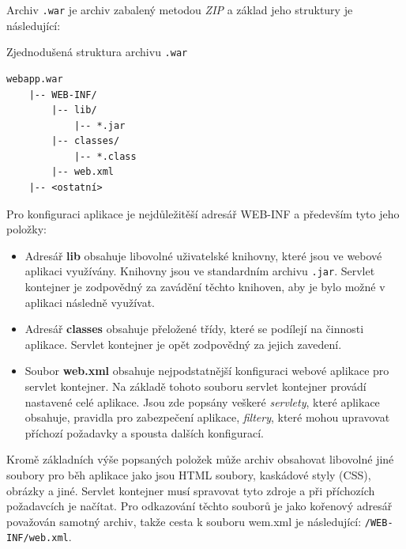             \medskip
            Archiv \texttt{.war} je archiv zabalený metodou \emph{ZIP} a základ jeho struktury je následující:
            
\begin{priklad} Zjednodušená struktura archivu \texttt{.war}
\begin{verbatim}
webapp.war
    |-- WEB-INF/
        |-- lib/
            |-- *.jar
        |-- classes/
            |-- *.class
        |-- web.xml
    |-- <ostatní>
\end{verbatim}
\end{priklad}


            Pro konfiguraci aplikace je nejdůležitěší adresář WEB-INF a především tyto jeho položky:

            \begin{itemize}
                \item Adresář \textbf{lib} obsahuje libovolné uživatelské knihovny, které jsou ve webové aplikaci využívány. 
                    Knihovny jsou ve standardním archivu \texttt{.jar}.
                    Servlet kontejner je zodpovědný za zavádění těchto knihoven, aby je bylo možné v aplikaci následně využívat.

                \item Adresář \textbf{classes} obsahuje přeložené třídy, které se podílejí na činnosti aplikace. 
                    Servlet kontejner je opět zodpovědný za jejich zavedení. 

                \item Soubor \textbf{web.xml} obsahuje nejpodstatnější konfiguraci webové aplikace pro servlet kontejner.
                    Na základě tohoto souboru servlet kontejner provádí nastavené celé aplikace.
                    Jsou zde popsány veškeré \emph{servlety}, které aplikace obsahuje, pravidla pro zabezpečení aplikace,
                    \emph{filtery}, které mohou upravovat příchozí požadavky a spousta dalších konfigurací. 
            \end{itemize}

            Kromě základních výše popsaných položek může archiv obsahovat libovolné jiné soubory pro běh aplikace jako jsou 
            HTML soubory, kaskádové styly (CSS), obrázky a jiné. Servlet kontejner musí spravovat tyto zdroje
            a při příchozích požadavcích je načítat. Pro odkazování těchto souborů je jako kořenový adresář považován
            samotný archiv, takže cesta k souboru wem.xml je následující: \texttt{/WEB-INF/web.xml}.

